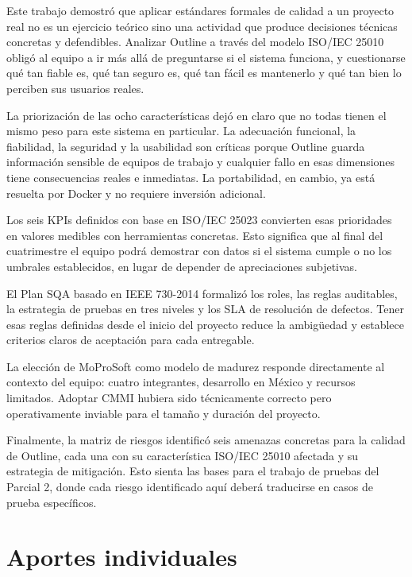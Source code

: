 \documentclass{report}
\begin{document}
Este trabajo demostró que aplicar estándares formales de calidad a un proyecto real no es un ejercicio teórico sino una actividad que produce decisiones técnicas concretas y defendibles. Analizar Outline a través del modelo ISO/IEC 25010 obligó al equipo a ir más allá de preguntarse si el sistema funciona, y cuestionarse qué tan fiable es, qué tan seguro es, qué tan fácil es mantenerlo y qué tan bien lo perciben sus usuarios reales.

La priorización de las ocho características dejó en claro que no todas tienen el mismo peso para este sistema en particular. La adecuación funcional, la fiabilidad, la seguridad y la usabilidad son críticas porque Outline guarda información sensible de equipos de trabajo y cualquier fallo en esas dimensiones tiene consecuencias reales e inmediatas. La portabilidad, en cambio, ya está resuelta por Docker y no requiere inversión adicional.

Los seis KPIs definidos con base en ISO/IEC 25023 convierten esas prioridades en valores medibles con herramientas concretas. Esto significa que al final del cuatrimestre el equipo podrá demostrar con datos si el sistema cumple o no los umbrales establecidos, en lugar de depender de apreciaciones subjetivas.

El Plan SQA basado en IEEE 730-2014 formalizó los roles, las reglas auditables, la estrategia de pruebas en tres niveles y los SLA de resolución de defectos. Tener esas reglas definidas desde el inicio del proyecto reduce la ambigüedad y establece criterios claros de aceptación para cada entregable.

La elección de MoProSoft como modelo de madurez responde directamente al contexto del equipo: cuatro integrantes, desarrollo en México y recursos limitados. Adoptar CMMI hubiera sido técnicamente correcto pero operativamente inviable para el tamaño y duración del proyecto.

Finalmente, la matriz de riesgos identificó seis amenazas concretas para la calidad de Outline, cada una con su característica ISO/IEC 25010 afectada y su estrategia de mitigación. Esto sienta las bases para el trabajo de pruebas del Parcial 2, donde cada riesgo identificado aquí deberá traducirse en casos de prueba específicos.



\chapter*{Aportes individuales}
\end{document}
